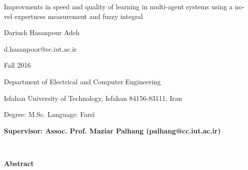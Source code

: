 \thispagestyle{empty}

\begin{latin}
\begin{center}

{\Huge Improvments in speed and quality of learning in multi-agent systems using a novel expertness measurement and fuzzy integral}

\vspace{1cm}

{\LARGE{Dariush Hasanpour Adeh}}

\vspace{0.2cm}

{\small d.hasanpoor@ec.iut.ac.ir}

\vspace{0.5cm}

Fall 2016

\vspace{0.5cm}

Department of Electrical and Computer Engineering

\vspace{0.2cm}

Isfahan University of Technology, Isfahan 84156-83111, Iran

\vspace{0.2cm}

Degree: M.Sc. \hspace*{3cm} Language: Farsi

\vspace{1cm}

{\small\textbf{Supervisor: Assoc. Prof. Maziar Palhang (palhang@cc.iut.ac.ir)}}
\end{center}
~\vfill



\noindent\textbf{Abstract}


\end{latin}
